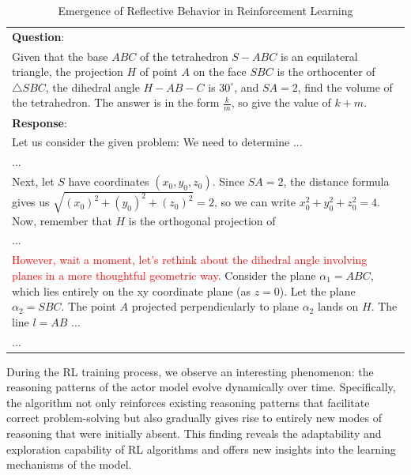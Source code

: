 \begin{table}[h]
    \centering
    \begin{tabular}{@{}p{}@{}} 
        \toprule 
        \textbf{Question}: \\
        Given that the base $ABC$ of the tetrahedron $S-ABC$ is an equilateral triangle, the projection $H$ of point $A$ on the face $SBC$ is the orthocenter of $\triangle SBC$, the dihedral angle $H-AB-C$ is $30^\circ$, and $SA = 2$, find the volume of the tetrahedron. The answer is in the form $\frac{k}{m}$, so give the value of $k+m$.\\
        \midrule 
        \textbf{Response}: \\
        Let us consider the given problem: We need to determine ... \\
        ... \\
        Next, let $S$ have coordinates $(x_0, y_0, z_0)$. Since $SA=2$, the distance formula gives us $\sqrt{(x_0)^2 + (y_0)^2 + (z_0)^2}= 2$, so we can write $x_0^2 + y_0^2 + z_0^2= 4$. Now, remember that $H$ is the orthogonal projection of\\
        ... \\
        \textcolor{red}{However, wait a moment, let's rethink about the dihedral angle involving planes in a more thoughtful geometric way.} Consider the plane $\alpha_1=ABC$, which lies entirely on the xy coordinate plane (as $z = 0$). Let the plane $\alpha_2=SBC$. The point $A$ projected perpendicularly to plane $\alpha_2$ lands on $H$. The line $l=AB$ ...\\
        ... \\
        \bottomrule
    \end{tabular}
    \caption{Emergence of Reflective Behavior in Reinforcement Learning}
    \label{tab:case_study1}
\end{table}

During the RL training process, we observe an interesting phenomenon: the reasoning patterns of the actor model evolve dynamically over time. Specifically, the algorithm not only reinforces existing reasoning patterns that facilitate correct problem-solving but also gradually gives rise to entirely new modes of reasoning that were initially absent.
This finding reveals the adaptability and exploration capability of RL algorithms and offers new insights into the learning mechanisms of the model.

